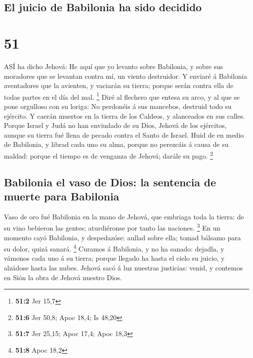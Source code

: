 \hypertarget{el-juicio-de-babilonia-ha-sido-decidido}{%
\subsection{El juicio de Babilonia ha sido
decidido}\label{el-juicio-de-babilonia-ha-sido-decidido}}

\hypertarget{section-50}{%
\section{51}\label{section-50}}

 ASÍ ha dicho Jehová: He aquí que yo levanto sobre
Babilonia, y sobre sus moradores que se levantan contra mí, un viento
destruidor.  Y enviaré á Babilonia aventadores que la
avienten, y vaciarán su tierra; porque serán contra ella de todas partes
en el día del mal. \footnote{\textbf{51:2} Jer 15,7}  Diré
al flechero que entesa su arco, y al que se pone orgulloso con su
loriga: No perdonéis á sus mancebos, destruid todo su ejército.
 Y caerán muertos en la tierra de los Caldeos, y alanceados
en sus calles.  Porque Israel y Judá no han enviudado de su
Dios, Jehová de los ejércitos, aunque su tierra fué llena de pecado
contra el Santo de Israel.  Huid de en medio de Babilonia, y
librad cada uno su alma, porque no perezcáis á causa de su maldad:
porque el tiempo es de venganza de Jehová; darále su pago. \footnote{\textbf{51:6}
  Jer 50,8; Apoc 18,4; Is 48,20}

\hypertarget{babilonia-el-vaso-de-dios-la-sentencia-de-muerte-para-babilonia}{%
\subsection{Babilonia el vaso de Dios: la sentencia de muerte para
Babilonia}\label{babilonia-el-vaso-de-dios-la-sentencia-de-muerte-para-babilonia}}

 Vaso de oro fué Babilonia en la mano de Jehová, que
embriaga toda la tierra: de su vino bebieron las gentes; aturdiéronse
por tanto las naciones. \footnote{\textbf{51:7} Jer 25,15; Apoc 17,4;
  Apoc 18,3}  En un momento cayó Babilonia, y despedazóse:
aullad sobre ella; tomad bálsamo para su dolor, quizá sanará.
\footnote{\textbf{51:8} Apoc 18,2}  Curamos á Babilonia, y
no ha sanado: dejadla, y vámonos cada uno á su tierra; porque llegado ha
hasta el cielo su juicio, y alzádose hasta las nubes. 
Jehová sacó á luz nuestras justicias: venid, y contemos en Sión la obra
de Jehová nuestro Dios.

